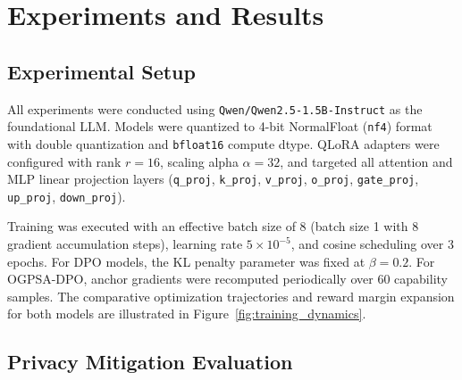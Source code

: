 \documentclass[11pt]{article}
\begin{document}
\section{Experiments and Results}
\label{sec:experiments}


\subsection{Experimental Setup}
All experiments were conducted using \texttt{Qwen/Qwen2.5-1.5B-Instruct} as the foundational LLM. Models were quantized to 4-bit NormalFloat (\texttt{nf4}) format with double quantization and \texttt{bfloat16} compute dtype. QLoRA adapters were configured with rank $r=16$, scaling alpha $\alpha=32$, and targeted all attention and MLP linear projection layers (\texttt{q\_proj}, \texttt{k\_proj}, \texttt{v\_proj}, \texttt{o\_proj}, \texttt{gate\_proj}, \texttt{up\_proj}, \texttt{down\_proj}).

Training was executed with an effective batch size of 8 (batch size 1 with 8 gradient accumulation steps), learning rate $5 \times 10^{-5}$, and cosine scheduling over 3 epochs. For DPO models, the KL penalty parameter was fixed at $\beta=0.2$. For OGPSA-DPO, anchor gradients were recomputed periodically over 60 capability samples. The comparative optimization trajectories and reward margin expansion for both models are illustrated in Figure~\ref{fig:training_dynamics}.

\subsection{Privacy Mitigation Evaluation}
\end{document}
